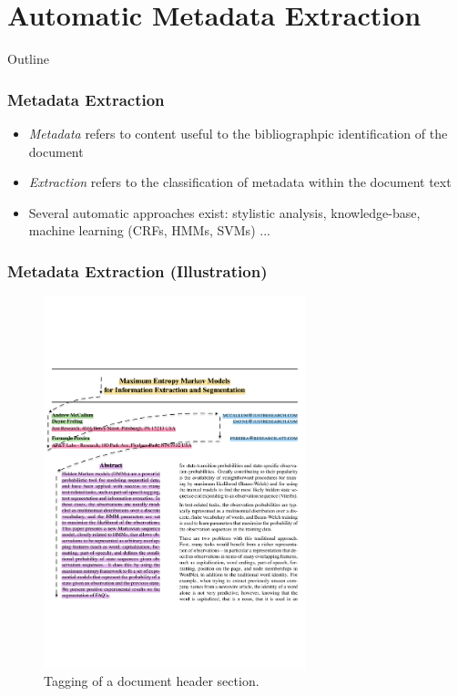 \documentclass{beamer}
\begin{document}

\section{Automatic Metadata Extraction}


\begin{frame}[noframenumbering]{Outline}
\end{frame}


\begin{frame}
\frametitle{Metadata Extraction}
\begin{itemize}
\item \emph{Metadata} refers to content useful to the bibliographpic identification of the document
\item \emph{Extraction} refers to the classification of metadata within the document text
\item Several automatic approaches exist: stylistic analysis, knowledge-base, machine learning (CRFs, HMMs, SVMs) ...
\end{itemize}
\end{frame}


\begin{frame}
\frametitle{Metadata Extraction (Illustration)}
\begin{figure}[h]
\center
\includegraphics[width=3in]{Figures/extraction.pdf}
\caption{Tagging of a document header section.}
\end{figure}
\end{frame}
\end{document}
